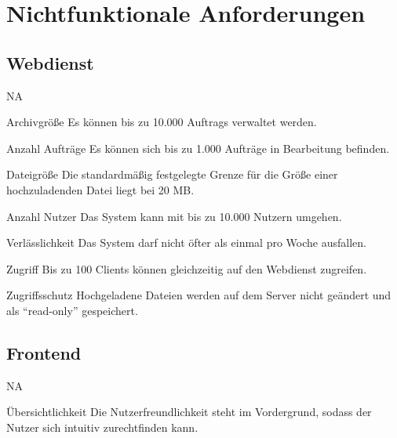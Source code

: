 \section{Nichtfunktionale Anforderungen}
\setcounter{counter}{10}
\subsection{Webdienst}
\begin{Kriterien}{NA}

	\item[Archivgröße] Es können bis zu 10.000 \glspl{Auftrag} verwaltet werden.

	\item[Anzahl Aufträge] Es können sich bis zu 1.000 Aufträge in Bearbeitung befinden.

	\item[Dateigröße] Die standardmäßig festgelegte Grenze für die Größe einer hochzuladenden Datei liegt bei 20 MB.

	\item[Anzahl \gls{Nutzer}] Das \gls{System} kann mit bis zu 10.000 Nutzern umgehen.

	\item[Verlässlichkeit] Das System darf nicht öfter als einmal pro Woche ausfallen.

	\item[Zugriff] Bis zu 100 \glspl{Client} können gleichzeitig auf den \gls{Webdienst} zugreifen.

	\item[Zugriffsschutz] Hochgeladene Dateien werden auf dem \gls{Server} nicht geändert und als \enquote{read-only} gespeichert.

\end{Kriterien}

\subsection{Frontend}
\begin{Kriterien}{NA}

	\item[Übersichtlichkeit] Die Nutzerfreundlichkeit steht im Vordergrund, sodass der Nutzer sich intuitiv zurechtfinden kann. 

\end{Kriterien}
